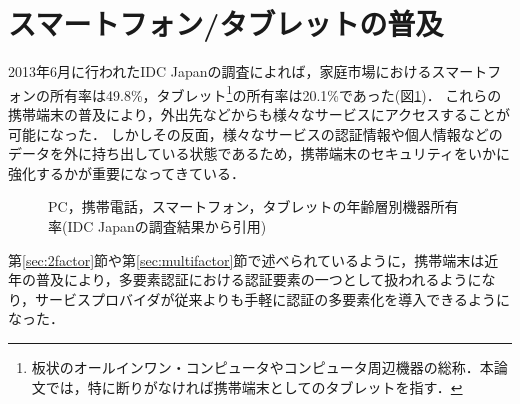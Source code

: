 \section{スマートフォン/タブレットの普及}
2013年6月に行われたIDC Japanの調査\cite{idcsmartphone}によれば，家庭市場におけるスマートフォンの所有率は49.8\%，タブレット\footnote{板状のオールインワン・コンピュータやコンピュータ周辺機器の総称．本論文では，特に断りがなければ携帯端末としてのタブレットを指す．}の所有率は20.1\%であった(図\ref{fig:smartphoneUsage})．
これらの携帯端末の普及により，外出先などからも様々なサービスにアクセスすることが可能になった．
しかしその反面，様々なサービスの認証情報や個人情報などのデータを外に持ち出している状態であるため，携帯端末のセキュリティをいかに強化するかが重要になってきている．

\begin{figure}[th]
\begin{center}
\end{center}
\caption{PC，携帯電話，スマートフォン，タブレットの年齢層別機器所有率(IDC Japanの調査結果\cite{idcsmartphone}から引用)}
\label{fig:smartphoneUsage}
\end{figure}

第\ref{sec:2factor}節や第\ref{sec:multifactor}節で述べられているように，携帯端末は近年の普及により，多要素認証における認証要素の一つとして扱われるようになり，サービスプロバイダが従来よりも手軽に認証の多要素化を導入できるようになった．

\newpage
